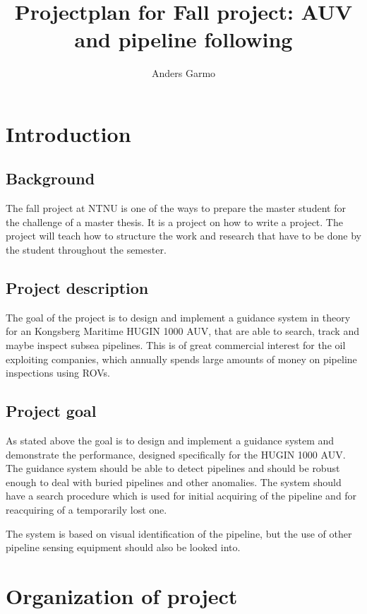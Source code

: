 \documentclass[a4paper,10pt]{article}
\title{Projectplan for Fall project: AUV and pipeline following}
\author{Anders Garmo}
\begin{document}
\maketitle
\newpage

\tableofcontents

\newpage

\section{Introduction}

	\subsection{Background}
	The fall project at NTNU is one of the ways to prepare the master student for the challenge of a master thesis. It is a project on how to write a project. The project will teach how to structure the work and research that have to be done by the student throughout the semester.
	
	
	\subsection{Project description}
	The goal of the project is to design and implement a guidance system in theory for an Kongsberg Maritime HUGIN 1000 AUV, that are able to search, track and maybe inspect subsea pipelines. This is of great commercial interest for the oil exploiting companies, which annually spends large amounts of money on pipeline inspections using ROVs. 
		
	\subsection{Project goal}
	As stated above the goal is to design and implement a guidance system and demonstrate the performance, designed specifically for the HUGIN 1000 AUV. The guidance system should be able to detect pipelines and should be robust enough to deal with buried pipelines and other anomalies. The system should have a search procedure which is used for initial acquiring of the pipeline and for reacquiring of a temporarily lost one. 
	
	The system is based on visual identification of the pipeline, but the use of other pipeline sensing equipment should also be looked into. 
	
\section{Organization of project}
\end{document}

